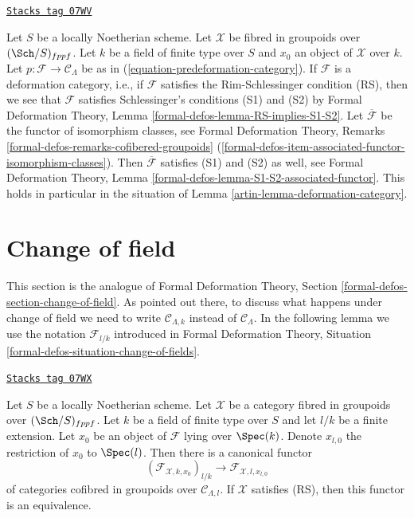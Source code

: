 \begin{remark}
\label{artin-remark-deformation-category-implies}
\href{https://stacks.math.columbia.edu/tag/07WV}{\texttt{Stacks tag 07WV}}

Let $S$ be a locally Noetherian scheme. Let $\mathcal{X}$ be fibred
in groupoids over $(\Sch/S)_{fppf}$. Let $k$ be a field of finite type over
$S$ and $x_0$ an object
of $\mathcal{X}$ over $k$. Let $p : \mathcal{F} \to \mathcal{C}_\Lambda$
be as in (\ref{equation-predeformation-category}). If $\mathcal{F}$
is a deformation category, i.e., if $\mathcal{F}$ satisfies the
Rim-Schlessinger condition (RS), then we see that $\mathcal{F}$ satisfies
Schlessinger's conditions (S1) and (S2) by
Formal Deformation Theory, Lemma \ref{formal-defos-lemma-RS-implies-S1-S2}.
Let $\overline{\mathcal{F}}$ be the functor of isomorphism classes, see
Formal Deformation Theory, Remarks
\ref{formal-defos-remarks-cofibered-groupoids}
(\ref{formal-defos-item-associated-functor-isomorphism-classes}).
Then $\overline{\mathcal{F}}$ satisfies (S1) and (S2) as well, see
Formal Deformation Theory, Lemma
\ref{formal-defos-lemma-S1-S2-associated-functor}.
This holds in particular in the situation of
Lemma \ref{artin-lemma-deformation-category}.
\end{remark}

\section{Change of field}
\label{artin-section-change-of-field}
This section is the analogue of
Formal Deformation Theory, Section \ref{formal-defos-section-change-of-field}.
As pointed out there, to discuss what happens under change of field
we need to write $\mathcal{C}_{\Lambda, k}$ instead of $\mathcal{C}_\Lambda$.
In the following lemma we use the notation $\mathcal{F}_{l/k}$
introduced in Formal Deformation Theory, Situation
\ref{formal-defos-situation-change-of-fields}.

\begin{lemma}
\label{artin-lemma-change-of-field}
\href{https://stacks.math.columbia.edu/tag/07WX}{\texttt{Stacks tag 07WX}}

Let $S$ be a locally Noetherian scheme. Let $\mathcal{X}$ be a category
fibred in groupoids over $(\Sch/S)_{fppf}$. Let $k$ be a
field of finite type over $S$ and let $l/k$ be a finite extension.
Let $x_0$ be an object of $\mathcal{F}$ lying over $\Spec(k)$.
Denote $x_{l, 0}$ the restriction of $x_0$ to $\Spec(l)$.
Then there is a canonical functor
$$
(\mathcal{F}_{\mathcal{X}, k , x_0})_{l/k}
\longrightarrow
\mathcal{F}_{\mathcal{X}, l, x_{l, 0}}
$$
of categories cofibred in groupoids over $\mathcal{C}_{\Lambda, l}$.
If $\mathcal{X}$ satisfies (RS), then this functor is an equivalence.
\end{lemma}

